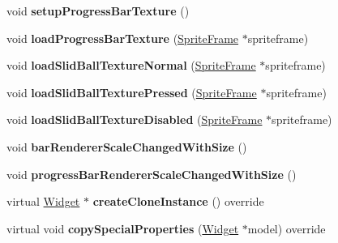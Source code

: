 \begin{DoxyCompactItemize}
\mbox{\label{classui_1_1Slider_aac42d247a5b222b609753f473eea3f3c}} 
void {\bfseries setup\+Progress\+Bar\+Texture} ()
\item 
\mbox{\label{classui_1_1Slider_a525b4d34c029e548b7d45db9cfd3499a}} 
void {\bfseries load\+Progress\+Bar\+Texture} (\hyperlink{classSpriteFrame}{Sprite\+Frame} $\ast$spriteframe)
\item 
\mbox{\label{classui_1_1Slider_a1069e115663db17e1f7dec261342f680}} 
void {\bfseries load\+Slid\+Ball\+Texture\+Normal} (\hyperlink{classSpriteFrame}{Sprite\+Frame} $\ast$spriteframe)
\item 
\mbox{\label{classui_1_1Slider_a0b0c0b0aa1b27b6d6400751818a0bcb7}} 
void {\bfseries load\+Slid\+Ball\+Texture\+Pressed} (\hyperlink{classSpriteFrame}{Sprite\+Frame} $\ast$spriteframe)
\item 
\mbox{\label{classui_1_1Slider_a31c8f741efd1f521f93d8d5f4aba2363}} 
void {\bfseries load\+Slid\+Ball\+Texture\+Disabled} (\hyperlink{classSpriteFrame}{Sprite\+Frame} $\ast$spriteframe)
\item 
\mbox{\label{classui_1_1Slider_a27cb867d5457007b5e693dc31796cd84}} 
void {\bfseries bar\+Renderer\+Scale\+Changed\+With\+Size} ()
\item 
\mbox{\label{classui_1_1Slider_a148f323386e35f4d0fc2e9239d53476d}} 
void {\bfseries progress\+Bar\+Renderer\+Scale\+Changed\+With\+Size} ()
\item 
\mbox{\label{classui_1_1Slider_af6f5689c8c55b2f7cd7f4c61f214b2b6}} 
virtual \hyperlink{classui_1_1Widget}{Widget} $\ast$ {\bfseries create\+Clone\+Instance} () override
\item 
\mbox{\label{classui_1_1Slider_a5990112ee3e13718cfbca643799c7b0d}} 
virtual void {\bfseries copy\+Special\+Properties} (\hyperlink{classui_1_1Widget}{Widget} $\ast$model) override
\item 
\mbox{\label{classui_1_1Slider_a306ee171bac1bd114177ebb0722aa1c8}} 

\end{DoxyCompactItemize}
